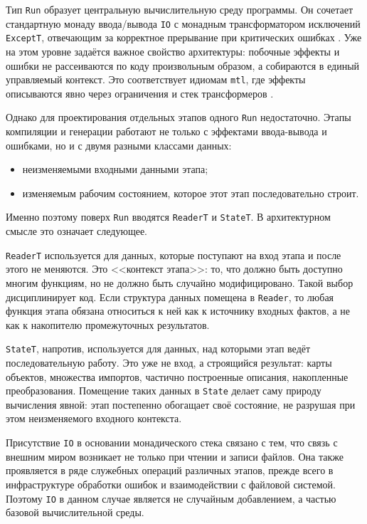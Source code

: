 \documentclass[a4paper,12pt]{article}
\begin{document}
Тип \texttt{Run} образует центральную вычислительную среду программы. Он сочетает
стандартную монаду ввода/вывода \texttt{IO} с монадным трансформатором исключений \texttt{ExceptT}, отвечающим за
корректное прерывание при критических ошибках \cite{hackage_IO,hackage_except}. Уже на этом уровне задаётся важное
свойство архитектуры: побочные эффекты и ошибки не рассеиваются по коду произвольным
образом, а собираются в единый управляемый контекст. Это соответствует идиомам
\texttt{mtl}, где эффекты описываются явно через ограничения и стек трансформеров
\cite{hackage_mtl}. 

Однако для проектирования отдельных этапов одного \texttt{Run} недостаточно. Этапы
компиляции и генерации работают не только с эффектами ввода-вывода и ошибками, но и с
двумя разными классами данных:
\begin{itemize}
  \item неизменяемыми входными данными этапа;
  \item изменяемым рабочим состоянием, которое этот этап последовательно строит.
\end{itemize}

Именно поэтому поверх \texttt{Run} вводятся \texttt{ReaderT} и \texttt{StateT}. В
архитектурном смысле это означает следующее.

\texttt{ReaderT} используется для данных, которые поступают на вход этапа и после этого
не меняются. Это <<контекст этапа>>: то, что должно быть доступно многим функциям, но не
должно быть случайно модифицировано. Такой выбор дисциплинирует код. Если структура
данных помещена в \texttt{Reader}, то любая функция этапа обязана относиться к ней как
к источнику входных фактов, а не как к накопителю промежуточных результатов.

\texttt{StateT}, напротив, используется для данных, над которыми этап ведёт
последовательную работу. Это уже не вход, а строящийся результат: карты объектов,
множества импортов, частично построенные описания, накопленные преобразования. Помещение
таких данных в \texttt{State} делает саму природу вычисления явной: этап постепенно
обогащает своё состояние, не разрушая при этом неизменяемого входного контекста.

Присутствие \texttt{IO} в основании монадического стека связано с тем, что связь с
внешним миром возникает не только при чтении и записи файлов. Она также проявляется в
ряде служебных операций различных этапов, прежде всего в инфраструктуре обработки
ошибок и взаимодействии с файловой системой. Поэтому \texttt{IO} в данном случае
является не случайным добавлением, а частью базовой вычислительной среды.
\end{document}
